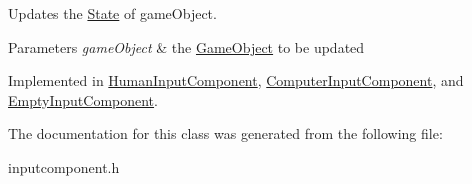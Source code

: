 Updates the \hyperlink{classState}{State} of game\-Object. 


\begin{DoxyParams}{Parameters}
{\em game\-Object} & the \hyperlink{classGameObject}{Game\-Object} to be updated \\
\hline
\end{DoxyParams}


Implemented in \hyperlink{classHumanInputComponent_a10e31c29b86c3c6fff99e699dca28e82}{Human\-Input\-Component}, \hyperlink{classComputerInputComponent_abddd2bdc7efb465f49173a3634148bbc}{Computer\-Input\-Component}, and \hyperlink{classEmptyInputComponent_a5e11b3048e027761e465072cda02a034}{Empty\-Input\-Component}.



The documentation for this class was generated from the following file\-:\begin{DoxyCompactItemize}
\item 
inputcomponent.\-h\end{DoxyCompactItemize}
